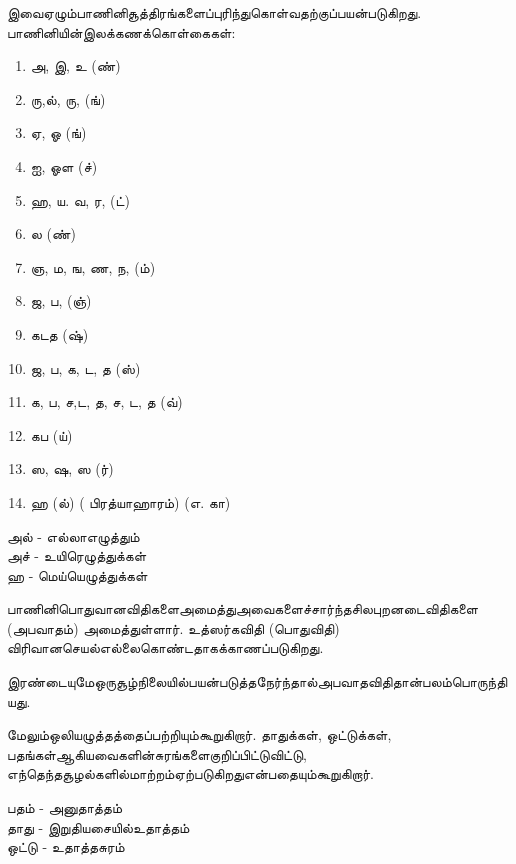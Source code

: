 இவைஏழும்பாணினிசூத்திரங்களைப்புரிந்துகொள்வதற்குப்பயன்படுகிறது. பாணினியின்இலக்கணக்கொள்கைகள்:

\begin{enumerate}
\item அ, இ, உ (ண்)

 \item ரு,ல், ரு, (ங்)

 \item ஏ, ஓ (ங்)

 \item ஐ, ஓள (ச்)

 \item ஹ, ய. வ, ர, (ட்) 

 \item ல (ண்)

 \item ஞ, ம, ங, ண, ந, (ம்)

 \item ஜ, ப, (ஞ்)

 \item கடத (ஷ்)

 \item ஜ, ப, க, ட, த (ஸ்)

 \item க, ப, ச,ட, த, ச, ட, த (வ்) 

 \item கப (ய்)

 \item ஸ, ஷ, ஸ (ர்)

 \item ஹ (ல்) ( பிரத்யாஹாரம்) (எ. கா)

\end{enumerate}

அல் - எல்லாஎழுத்தும்\\ அச் - உயிரெழுத்துக்கள்\\ ஹ - மெய்யெழுத்துக்கள்

பாணினிபொதுவானவிதிகளைஅமைத்துஅவைகளைச்சார்ந்தசிலபுறனடைவிதிகளை (அபவாதம்) அமைத்துள்ளார். உத்ஸர்கவிதி (பொதுவிதி) விரிவானசெயல்எல்லைகொண்டதாகக்காணப்படுகிறது.

இரண்டையுமேஒருசூழ்நிலையில்பயன்படுத்தநேர்ந்தால்அபவாதவிதிதான்பலம்பொருந்தியது.

மேலும்ஒலியழுத்தத்தைப்பற்றியும்கூறுகிறார். தாதுக்கள், ஒட்டுக்கள், பதங்கள்ஆகியவைகளின்சுரங்களைகுறிப்பிட்டுவிட்டு, எந்தெந்தசூழல்களில்மாற்றம்ஏற்படுகிறதுஎன்பதையும்கூறுகிறார்.

பதம் - அனுதாத்தம்\\ தாது - இறுதியசையில்உதாத்தம்\\ ஒட்டு - உதாத்தசுரம்

